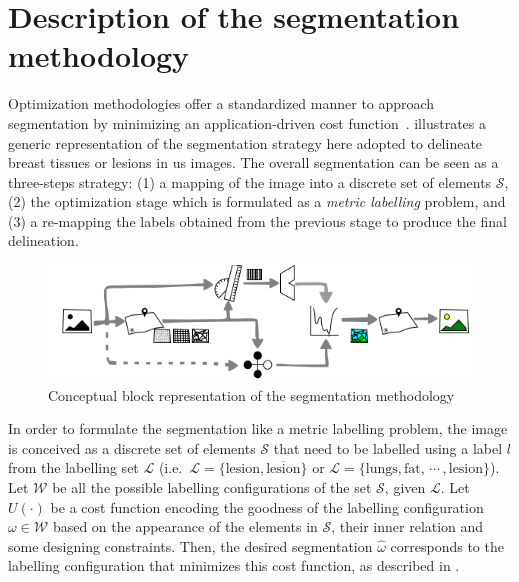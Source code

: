 \graphicspath{ {./content/method/figures/visual_cues/} {./content/method/figures/}}

\section{Description of the segmentation methodology} 

Optimization methodologies offer a standardized manner to approach segmentation by minimizing an application-driven cost function~\cite{cremers2007review}.
 illustrates a generic representation of the segmentation strategy here adopted to delineate breast tissues or lesions in \ac{us} images. 
The overall segmentation can be seen as a three-steps strategy: 
(1) a mapping of the image into a discrete set of elements $\mathcal{S}$, 
(2) the optimization stage which is formulated as a \emph{metric labelling} problem, 
and (3) a re-mapping the labels obtained from the previous stage to produce the final delineation. 

\begin{figure}[htpb]
  \centering
  \includegraphics[width=0.9\linewidth]{method}
  \caption{Conceptual block representation of the segmentation methodology}
  \label{fig:method}
\end{figure}


In order to formulate the segmentation like a metric labelling problem, the image is conceived as a discrete set of elements $\mathcal{S}$ that need to be labelled using a label $l$ from the labelling set $\mathcal{L}$ 
(i.e.\, $\mathcal{L} = \{\text{lesion}, \overline{\text{lesion}}\}$ 
or $\mathcal{L} = \{\text{lungs}, \text{fat},\,\cdots\,, \text{lesion}\}$).
Let $\mathcal{W}$ be all the possible labelling configurations of the set $\mathcal{S}$, given $\mathcal{L}$.
Let $U(\cdot)$ be a cost function encoding the goodness of the labelling configuration $\omega \in \mathcal{W}$ based on the appearance of the elements in $\mathcal{S}$, their inner relation and some designing constraints.
Then, the desired segmentation $\hat{\omega}$ corresponds to the labelling configuration that minimizes this cost function, as described in .

